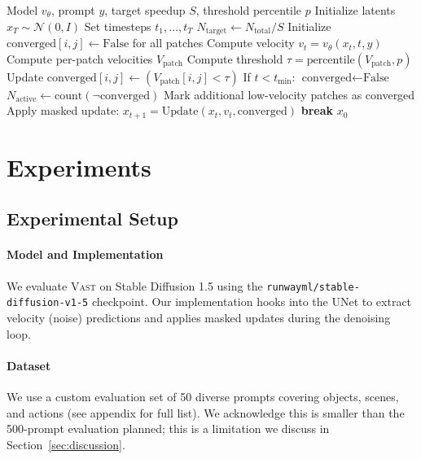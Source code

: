 \documentclass{article}
\newcommand{\vast}{\textsc{Vast}}
\begin{document}
\begin{algorithm}[t]
\caption{VAST Sampling}
\label{alg:vast}
\begin{algorithmic}[1]
\REQUIRE Model $v_\theta$, prompt $y$, target speedup $S$, threshold percentile $p$
\STATE Initialize latents $x_T \sim \mathcal{N}(0, I)$
\STATE Set timesteps $t_1, \ldots, t_T$
\STATE $N_{\text{target}} \leftarrow N_{\text{total}} / S$
\STATE Initialize $\text{converged}[i,j] \leftarrow \text{False}$ for all patches
    \STATE Compute velocity $v_t = v_\theta(x_t, t, y)$
    \STATE Compute per-patch velocities $V_{\text{patch}}$
    \STATE Compute threshold $\tau = \text{percentile}(V_{\text{patch}}, p)$
    \STATE Update $\text{converged}[i,j] \leftarrow (V_{\text{patch}}[i,j] < \tau)$
    \STATE If $t < t_{\text{min}}$: $\text{converged} \leftarrow \text{False}$
    \STATE $N_{\text{active}} \leftarrow \text{count}(\neg\text{converged})$
        \STATE Mark additional low-velocity patches as converged
    \ENDIF
    \STATE Apply masked update: $x_{t+1} = \text{Update}(x_t, v_t, \text{converged})$
        \STATE \textbf{break}
    \ENDIF
\ENDFOR
\RETURN $x_0$
\end{algorithmic}
\end{algorithm}

\section{Experiments}
\label{sec:experiments}

\subsection{Experimental Setup}

\paragraph{Model and Implementation} We evaluate \vast{} on Stable Diffusion 1.5 \citep{rombach2022high} using the \texttt{runwayml/stable-diffusion-v1-5} checkpoint. Our implementation hooks into the UNet to extract velocity (noise) predictions and applies masked updates during the denoising loop.

\paragraph{Dataset} We use a custom evaluation set of 50 diverse prompts covering objects, scenes, and actions (see appendix for full list). We acknowledge this is smaller than the 500-prompt evaluation planned; this is a limitation we discuss in Section~\ref{sec:discussion}.
\end{document}
